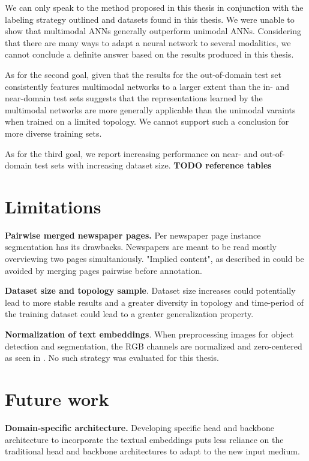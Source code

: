\documentclass[oneside, english, bibtex]{kththesis}
\begin{document}
We can only speak to the method proposed in this thesis in conjunction with the labeling strategy outlined and datasets found in this thesis. We were unable to show that multimodal ANNs generally outperform unimodal ANNs. Considering that there are many ways to adapt a neural network to several modalities, we cannot conclude a definite answer based on the results produced in this thesis. 

As for the second goal, given that the results for the out-of-domain test set consistently features multimodal networks to a larger extent than the in- and near-domain test sets suggests that the representations learned by the multimodal networks are more generally applicable than the unimodal varaints when trained on a limited topology. We cannot support such a conclusion for more diverse training sets.

As for the third goal, we report increasing performance on near- and out-of-domain test sets with increasing dataset size. \textbf{TODO reference tables}

\section{Limitations}

\textbf{Pairwise merged newspaper pages.} Per newspaper page instance segmentation has its drawbacks. Newspapers are meant to be read mostly overviewing two pages simultaniously. "Implied content", as described in  could be avoided by merging pages pairwise before annotation.


\textbf{Dataset size and topology sample}. Dataset size increases could potentially lead to more stable results and a greater diversity in topology and time-period of the training dataset could lead to a greater generalization property.


\textbf{Normalization of text embeddings}. When preprocessing images for object detection and segmentation, the RGB channels are normalized and zero-centered as seen in . No such strategy was evaluated for this thesis.

\section{Future work}

\textbf{Domain-specific architecture.} Developing specific head and backbone architecture to incorporate the textual embeddings puts less reliance on the traditional head and backbone architectures to adapt to the new input medium.
\end{document}
